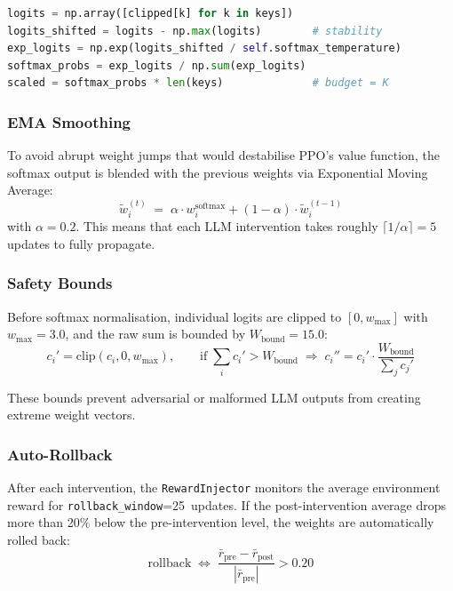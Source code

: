 \begin{lstlisting}[style=code, language=Python, caption={Softmax attention budget in \texttt{reward\_injector.py}.}, label={lst:softmax_code}]
logits = np.array([clipped[k] for k in keys])
logits_shifted = logits - np.max(logits)        # stability
exp_logits = np.exp(logits_shifted / self.softmax_temperature)
softmax_probs = exp_logits / np.sum(exp_logits)
scaled = softmax_probs * len(keys)              # budget = K
\end{lstlisting}

\subsubsection{EMA Smoothing}
\label{sec:ema_smoothing}

To avoid abrupt weight jumps that would destabilise PPO's value function,
the softmax output is blended with the previous weights via
Exponential Moving Average:
\begin{equation}
\label{eq:ema}
    \widetilde{w}_i^{(t)}
    \;=\;
    \alpha \cdot w_i^{\text{softmax}}
    + (1-\alpha) \cdot \widetilde{w}_i^{(t-1)}
\end{equation}
with $\alpha=0.2$. This means that each LLM intervention takes
roughly $\lceil 1/\alpha \rceil = 5$ updates to fully propagate.

\subsubsection{Safety Bounds}
\label{sec:safety}

Before softmax normalisation, individual logits are clipped to
$[0, w_{\max}]$ with $w_{\max}=3.0$, and the raw sum is bounded
by $W_{\text{bound}}=15.0$:
\begin{equation}
    c_i' = \text{clip}(c_i, 0, w_{\max}),
    \qquad
    \text{if}\; \sum_i c_i' > W_{\text{bound}}
    \;\Rightarrow\;
    c_i'' = c_i' \cdot \frac{W_{\text{bound}}}{\sum_j c_j'}
\end{equation}

These bounds prevent adversarial or malformed LLM outputs from
creating extreme weight vectors.

\subsubsection{Auto-Rollback}
\label{sec:rollback}

After each intervention, the \texttt{RewardInjector} monitors the
average environment reward for \texttt{rollback\_window}=25~updates.
If the post-intervention average drops more than 20\% below the
pre-intervention level, the weights are automatically rolled back:
\begin{equation}
    \text{rollback}
    \;\Longleftrightarrow\;
    \frac{
        \bar{r}_{\text{pre}} - \bar{r}_{\text{post}}
    }{
        |\bar{r}_{\text{pre}}|
    }
    > 0.20
\end{equation}


